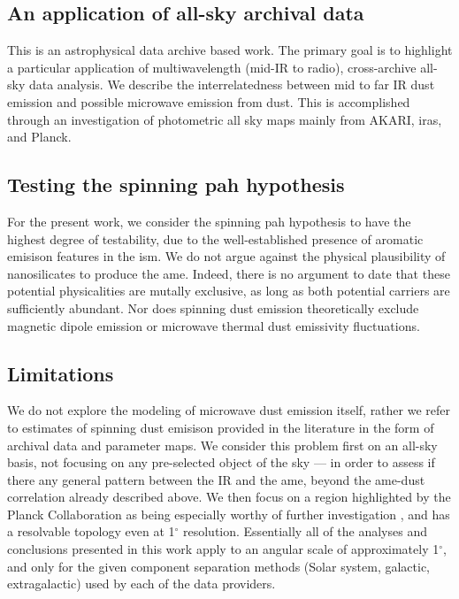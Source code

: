   \subsection{An application of all-sky archival data}
    This is an astrophysical data archive based work. The primary goal is to highlight a particular application of multiwavelength (mid-IR to radio), cross-archive all-sky data analysis. We describe the interrelatedness between mid to far IR dust emission and possible microwave emission from dust. This is accomplished through an investigation of photometric all sky maps mainly from AKARI, \acrshort{iras}, and Planck.

  \subsection{Testing the spinning \acrshort{pah} hypothesis}
    For the present work, we consider the spinning \acrshort{pah} hypothesis to have the highest degree of testability, due to the well-established presence of aromatic emisison features in the \acrshort{ism}.  We do not argue against the physical plausibility of nanosilicates to produce the \acrshort{ame}. Indeed, there is no argument to date that these potential physicalities are mutally exclusive, as long as both potential carriers are sufficiently abundant. Nor does spinning dust emission theoretically exclude magnetic dipole emission or microwave thermal dust emissivity fluctuations.

  \subsection{Limitations}
    We do not explore the modeling of microwave dust emission itself, rather we refer to estimates of spinning dust emisison provided in the literature \citep{planckXII, wmap03b} in the form of archival data and parameter maps. We consider this problem first on an all-sky basis, not focusing on any pre-selected object of the sky --- in order to assess if there any general pattern between the IR and the \acrshort{ame}, beyond the \acrshort{ame}-dust correlation already described above. We then focus on a region highlighted by the Planck Collaboration as being especially worthy of further investigation \citep{planck15X}, and has a resolvable topology even at 1$^\circ$ resolution. Essentially all of the analyses and conclusions presented in this work apply to an angular scale of approximately 1$^\circ$, and only for the given component separation methods (Solar system, galactic, extragalactic) used by each of the data providers.

